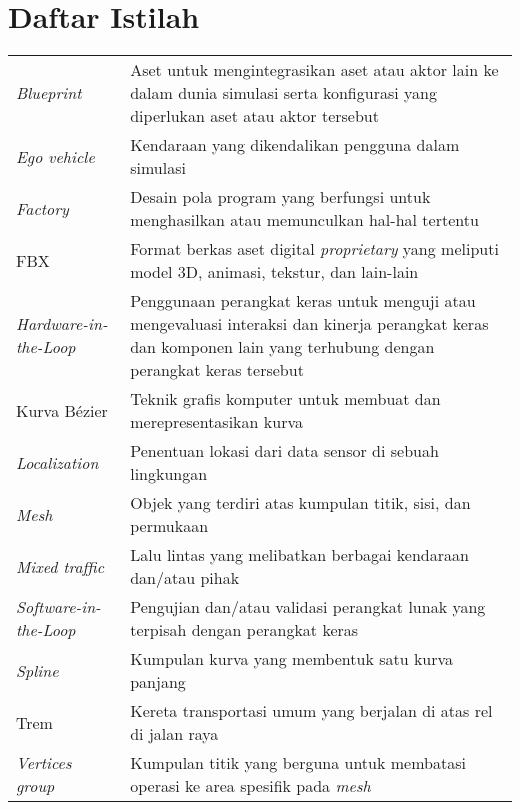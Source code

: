 \chapter*{Daftar Istilah}

\begingroup
\def\arraystretch{1.25}
\begin{onehalfspace}
\begin{longtable}{p{} p{}}

	\textit{Blueprint} & Aset untuk mengintegrasikan aset atau aktor lain ke dalam dunia simulasi serta konfigurasi yang diperlukan aset atau aktor tersebut \\
	\textit{Ego vehicle} & Kendaraan yang dikendalikan pengguna dalam simulasi \\
	\textit{Factory} & Desain pola program yang berfungsi untuk menghasilkan atau memunculkan hal-hal tertentu \\
	FBX & Format berkas aset digital \textit{proprietary} yang meliputi model 3D, animasi, tekstur, dan lain-lain \\
	\textit{Hardware-in-the-Loop} & Penggunaan perangkat keras untuk menguji atau mengevaluasi interaksi dan kinerja perangkat keras dan komponen lain yang terhubung dengan perangkat keras tersebut \\
	Kurva Bézier & Teknik grafis komputer untuk membuat dan merepresentasikan kurva \\
	\textit{Localization} & Penentuan lokasi dari data sensor di sebuah lingkungan \\
	\textit{Mesh} & Objek yang terdiri atas kumpulan titik, sisi, dan permukaan \\
	\textit{Mixed traffic} & Lalu lintas yang melibatkan berbagai kendaraan dan/atau pihak \\
	\textit{Software-in-the-Loop} & Pengujian dan/atau validasi perangkat lunak yang terpisah dengan perangkat keras \\
	\textit{Spline} & Kumpulan kurva yang membentuk satu kurva panjang \\
	Trem & Kereta transportasi umum yang berjalan di atas rel di jalan raya \\
	\textit{Vertices group} & Kumpulan titik yang berguna untuk membatasi operasi ke area spesifik pada \textit{mesh} \\

\end{longtable}
\end{onehalfspace}
\endgroup
\clearpage
